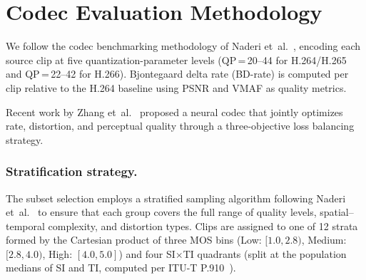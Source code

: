 \documentclass{article}
\begin{document}
\section{Codec Evaluation Methodology}

We follow the codec benchmarking methodology of Naderi
et~al.~\cite{naderi_vcd_2024}, encoding each source clip at five
quantization-parameter levels (QP\,=\,20--44 for H.264/H.265 and QP\,=\,22--42 for H.266).
Bjontegaard delta rate (BD-rate)
is computed per clip relative to the H.264 baseline using PSNR and VMAF
as quality metrics.

Recent work by Zhang et~al.~\cite{zhang_neural_2023} proposed a neural
codec that jointly optimizes rate, distortion, and perceptual quality
through a three-objective loss balancing strategy.

\subsubsection{Stratification strategy.}
\label{sec:stratification}

The subset selection employs a stratified sampling algorithm following Naderi
et~al.~\cite{naderi_vcd_2024} to ensure that each group covers the full
range of quality levels, spatial--temporal complexity, and distortion types.
Clips are assigned to one of 12 strata formed by the Cartesian product of
three MOS bins (Low: $[1.0, 2.8)$, Medium: $[2.8, 4.0)$, High:
$[4.0, 5.0]$) and four SI$\times$TI quadrants (split at the population
medians of SI and TI, computed per ITU-T
P.910~\cite{itu-t_recommendation_p910_subjective_2023}).



\end{document}
